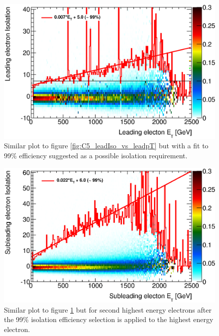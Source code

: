    \begin{figure}[h!]
      \begin{center}
      \includegraphics[scale=0.7]{images/C5_leadIso_vs_leadpT_proposal.eps}
      \end{center}
   \caption{Similar plot to figure \ref{fig:C5_leadIso_vs_leadpT} but with a fit to 99\% efficiency suggested as a possible isolation requirement.}
   \label{fig:C5_leadIso_vs_leadpT_proposal}
   \end{figure}


   \begin{figure}[h!]
      \begin{center}
      \includegraphics[scale=0.7]{images/C5_subIso_vs_subpT_proposal.eps}
      \end{center}
   \caption{Similar plot to figure \ref{fig:C5_leadIso_vs_leadpT_proposal} but for second highest energy electrons after the 99\% isolation efficiency selection is applied to the highest energy electron.}
   \label{fig:C5_subIso_vs_subpT_proposal}
   \end{figure}



